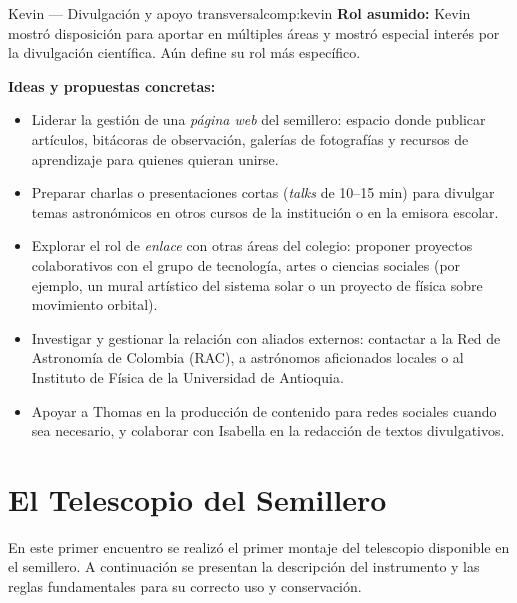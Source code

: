 \begin{compromiso}{Kevin — Divulgación y apoyo transversal}{comp:kevin}
    \textbf{Rol asumido:} Kevin mostró disposición para aportar en múltiples áreas
    y mostró especial interés por la divulgación científica. Aún define su rol
    más específico.

    \medskip
    \textbf{Ideas y propuestas concretas:}
    \begin{itemize}[leftmargin=1.5em]
        \item Liderar la gestión de una \textit{página web} del semillero: espacio
              donde publicar artículos, bitácoras de observación, galerías de
              fotografías y recursos de aprendizaje para quienes quieran unirse.
        \item Preparar charlas o presentaciones cortas (\textit{talks} de 10--15 min)
              para divulgar temas astronómicos en otros cursos de la institución o en
              la emisora escolar.
        \item Explorar el rol de \textit{enlace} con otras áreas del colegio: proponer
              proyectos colaborativos con el grupo de tecnología, artes o ciencias
              sociales (por ejemplo, un mural artístico del sistema solar o un proyecto
              de física sobre movimiento orbital).
        \item Investigar y gestionar la relación con aliados externos: contactar a la
              Red de Astronomía de Colombia (RAC), a astrónomos aficionados locales o
              al Instituto de Física de la Universidad de Antioquia.
        \item Apoyar a Thomas en la producción de contenido para redes sociales cuando
              sea necesario, y colaborar con Isabella en la redacción de textos
              divulgativos.
    \end{itemize}
\end{compromiso}

\section{El Telescopio del Semillero}

En este primer encuentro se realizó el primer montaje del telescopio disponible en el
semillero. A continuación se presentan la descripción del instrumento y las reglas
fundamentales para su correcto uso y conservación.

